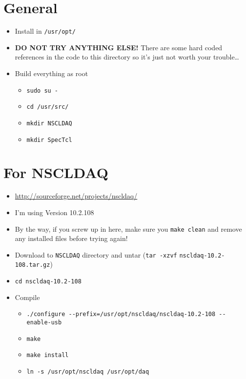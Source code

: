 \documentclass[11pt]{article}
\begin{document}
\section*{General}
\label{sec-2}
\begin{itemize}
\item Install in \verb~/usr/opt/~
\item \textbf{DO NOT TRY ANYTHING ELSE!} There are some hard coded references
in the code to this directory so it's just not worth your
trouble\ldots{}
\item Build everything as root
\begin{itemize}
\item \verb~sudo su -~
\item \verb~cd /usr/src/~
\item \verb~mkdir NSCLDAQ~
\item \verb~mkdir SpecTcl~
\end{itemize}
\end{itemize}
\section*{For NSCLDAQ}
\label{sec-3}
\begin{itemize}
\item \url{http://sourceforge.net/projects/nscldaq/}
\item I'm using Version 10.2.108
\item By the way, if you screw up in here, make sure you \verb~make clean~
and remove any installed files before trying again!
\item Download to \verb~NSCLDAQ~ directory and untar (\verb~tar -xzvf~
    \verb~nscldaq-10.2-108.tar.gz~)
\item \verb~cd nscldaq-10.2-108~
\item Compile
\begin{itemize}
\item \verb~./configure --prefix=/usr/opt/nscldaq/nscldaq-10.2-108 --enable-usb~
\item \verb~make~
\item \verb~make install~
\item \verb~ln -s /usr/opt/nscldaq /usr/opt/daq~
\end{itemize}
\end{itemize}
\end{document}
